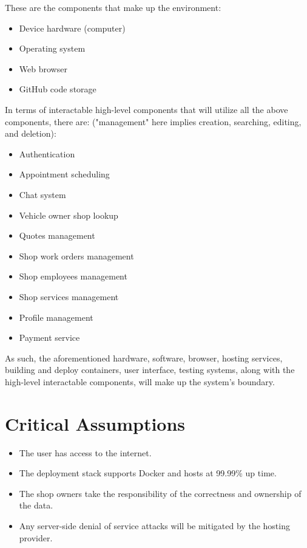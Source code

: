 \documentclass{article}
\begin{document}
These are the components that make up the environment:
\begin{itemize}
    \item Device hardware (computer)
    \item Operating system
    \item Web browser
    \item GitHub code storage
\end{itemize}

In terms of interactable high-level components that will utilize all the above components, there are: ("management" here implies creation, searching, editing, and deletion):
\begin{itemize}
    \item Authentication
    \item Appointment scheduling
    \item Chat system
    \item Vehicle owner shop lookup
    \item Quotes management
    \item Shop work orders management
    \item Shop employees management
    \item Shop services management
    \item Profile management
    \item Payment service
\end{itemize}

As such, the aforementioned hardware, software, browser, hosting services, building and deploy containers, user interface, testing systems, along with the high-level interactable components, will make up the system's boundary.

\section{Critical Assumptions}

\begin{itemize}
    \item The user has access to the internet.
    \item The deployment stack supports Docker and hosts at 99.99\% up time.
    \item The shop owners take the responsibility of the correctness and ownership of the data.
    \item Any server-side denial of service attacks will be mitigated by the hosting provider.
\end{itemize}
\end{document}
